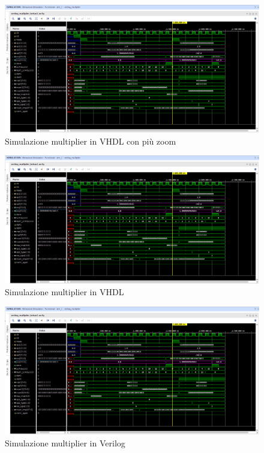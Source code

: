 \documentclass[]{IEEEtran}
\begin{document}
\begin{figure}[bt]
    \centering
    \includegraphics[width=\textwidth]{figures/sim_mult_verilog}
    \caption{Simulazione multiplier in VHDL con più zoom}
    \label{fig:SIM_MULT_VHDL_ZOOM}
\end{figure}

\begin{figure}[bt]
    \centering
    \includegraphics[width=\textwidth]{figures/sim_mult_verilog}
    \caption{Simulazione multiplier in VHDL}
    \label{fig:SIM_MULT_VHDL}
\end{figure}

\begin{figure}[bt]
    \centering
    \includegraphics[width=\textwidth]{figures/sim_mult_verilog}
    \caption{Simulazione multiplier in Verilog}
    \label{fig:SIM_MULT_VERILOG}
\end{figure}
\end{document}
